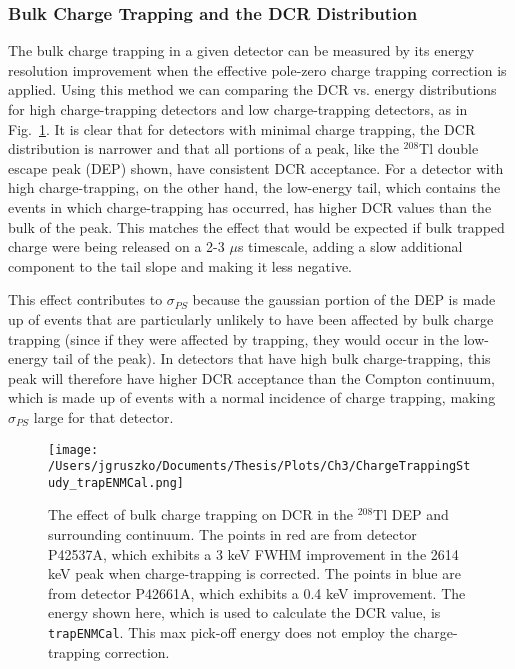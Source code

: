 \subsubsection{Bulk Charge Trapping and the DCR Distribution}
The bulk charge trapping in a given detector can be measured by its energy resolution improvement when the effective pole-zero charge trapping correction is applied. Using this method we can comparing the DCR vs. energy distributions for high charge-trapping detectors and low charge-trapping detectors, as in Fig.~\ref{fig:ct_DCRvE}. It is clear that for detectors with minimal charge trapping, the DCR distribution is narrower and that all portions of a peak, like the $^{208}$Tl double escape peak (DEP) shown, have consistent DCR acceptance. For a detector with high charge-trapping, on the other hand, the low-energy tail, which contains the events in which charge-trapping has occurred, has higher DCR values than the bulk of the peak. This matches the effect that would be expected if bulk trapped charge were being released on a 2-3 $\mu$s timescale, adding a slow additional component to the tail slope and making it less negative. 

This effect contributes to $\sigma_{PS}$ because the gaussian portion of the DEP is made up of events that are particularly unlikely to have been affected by bulk charge trapping (since if they were affected by trapping, they would occur in the low-energy tail of the peak). In detectors that have high bulk charge-trapping, this peak will therefore have higher DCR acceptance than the Compton continuum, which is made up of events with a normal incidence of charge trapping, making $\sigma_{PS}$ large for that detector. 

\begin{figure}[]
 \centering
 \texttt{[image: /Users/jgruszko/Documents/Thesis/Plots/Ch3/ChargeTrappingStudy\_trapENMCal.png]}
 \caption[The effect of bulk charge trapping on DCR in the $^{208}$Tl DEP and surrounding continuum.]{The effect of bulk charge trapping on DCR in the $^{208}$Tl DEP and surrounding continuum. The points in red are from detector P42537A, which exhibits a 3 keV FWHM improvement in the 2614 keV peak when charge-trapping is corrected. The points in blue are from detector P42661A, which exhibits a 0.4 keV improvement. The energy shown here, which is used to calculate the DCR value, is {\tt trapENMCal}. This max pick-off energy does not employ the charge-trapping correction.} 
 \label{fig:ct_DCRvE}
\end{figure}

